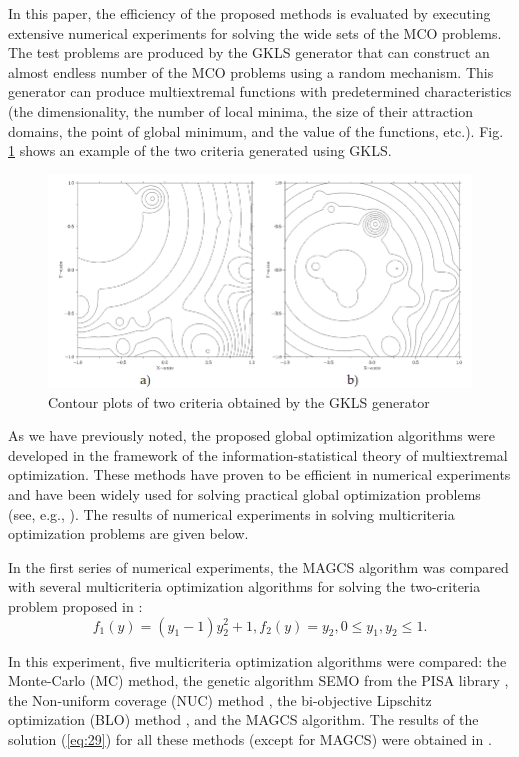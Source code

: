 \documentclass[smallextended]{svjour3}       %
\begin{document}
In this paper, the efficiency of the proposed methods is evaluated by executing extensive numerical experiments for solving the wide sets of the MCO problems. The test problems are produced by the GKLS generator \cite{c37} that can construct an almost endless number of the MCO problems using a random mechanism. This generator can produce multiextremal functions with predetermined characteristics (the dimensionality, the number of local minima, the size of their attraction domains, the point of global minimum, and the value of the functions, etc.). Fig. \ref{fig:3} shows an example of the two criteria generated using GKLS.

\begin{figure}
  \centering
  \includegraphics[width=0.8\linewidth]{fig3}
  \caption{Contour plots of two criteria obtained by the GKLS generator}
  \label{fig:3}
\end{figure}

As we have previously noted, the proposed global optimization algorithms were developed in the framework of the information-statistical theory of multiextremal optimization. These methods have proven to be efficient in numerical experiments and have been widely used for solving practical global optimization problems (see, e.g., \cite{c17,c18,c23,c26,c27,c33,c34}). The results of numerical experiments in solving multicriteria optimization problems are given below.

In the first series of numerical experiments, the MAGCS algorithm was compared with several multicriteria optimization algorithms for solving the two-criteria problem proposed in \cite{c35}:
\begin{equation}\label{eq:43}
f_1 (y)=(y_1-1) y_2^2+1,f_2 (y)=y_2, 0\leq y_1,y_2 \leq 1.
\end{equation}

In this experiment, five multicriteria optimization algorithms were compared: the Monte-Carlo (MC) method, the genetic algorithm SEMO from the PISA library \cite{c9,c36}, the Non-uniform coverage (NUC) method \cite{c35}, the bi-objective Lipschitz optimization (BLO) method \cite{c36}, and the MAGCS algorithm. The results of the solution (\ref{eq:29}) for all these methods (except for MAGCS) were obtained in \cite{c36}.
\end{document}
